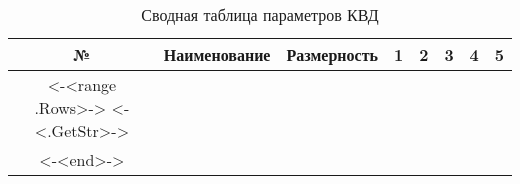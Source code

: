 	\begin{center}
		\begin{longtable}{|c|c|c|c|c|c|c|c|}
			\hline
			\textbf{№} & 
			\textbf{Наименование} & 
			\textbf{Размерность} & 
			\textbf{1} & 
			\textbf{2} &
			\textbf{3} &
			\textbf{4} &
			\textbf{5} \\\hline
			\endhead
			<-<range .Rows>->
				<-<.GetStr>-> \\\hline
			<-<end>->
		\caption{Сводная таблица параметров КВД} \label{tab:hpc-stage-total}
		\end{longtable}
	\end{center}
